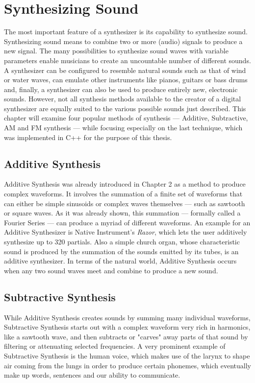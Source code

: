 \chapter{Synthesizing Sound}

The most important feature of a synthesizer is its capability to synthesize sound. Synthesizing sound means to combine two or more (audio) signals to produce a new signal. The many possibilities to synthesize sound waves with variable parameters enable musicians to create an uncountable number of different sounds. A synthesizer can be configured to resemble natural sounds such as that of wind or water waves, can emulate other instruments like pianos, guitars or bass drums and, finally, a synthesizer can also be used to produce entirely new, electronic sounds. However, not all synthesis methods available to the creator of a digital synthesizer are equally suited to the various possible sounds just described. This chapter will examine four popular methods of synthesis --- Additive, Subtractive, AM and FM synthesis --- while focusing especially on the last technique, which was implemented in C++ for the purpose of this thesis.

\section{Additive Synthesis}

Additive Synthesis was already introduced in Chapter 2 as a method to produce complex waveforms. It involves the summation of a finite set of waveforms that can either be simple sinusoids or complex waves themselves --- such as sawtooth or square waves. As it was already shown, this summation --- formally called a Fourier Series --- can produce a myriad of different waveforms. An example for an Additive Synthesizer is Native Instrument's \emph{Razor}, which lets the user additively synthesize up to 320 partials. Also a simple church organ, whose characteristic sound is produced by the summation of the sounds emitted by its tubes, is an additive synthesizer. In terms of the natural world, Additive Synthesis occurs when any two sound waves meet and combine to produce a new sound.

\section{Subtractive Synthesis}

While Additive Synthesis creates sounds by summing many individual waveforms, Subtractive Synthesis starts out with a complex waveform very rich in harmonics, like a sawtooth wave, and then subtracts or "carves" away parts of that sound by filtering or attenuating selected frequencies. A very prominent example of Subtractive Synthesis is the human voice, which makes use of the larynx to shape air coming from the lungs in order to produce certain phonemes, which eventually make up words, sentences and our ability to communicate.

